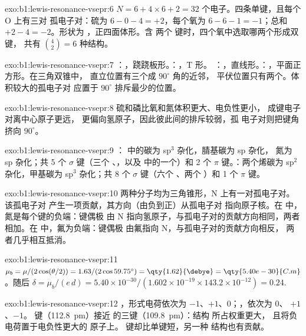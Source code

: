 \begin{solution}{exo:b1:lewis-resonance-vsepr:6}
$N = 6 + 4 \times 6 + 2 = 32$ 个电子。四条单键，且每个 O 上有三对
孤电子对：硫为 $6 - 0 - 4 = +2$，每个氧为
$6 - 6 - 1 = -1$；总和 $+2 - 4 = -2$。形状为 ，正四面体形。含
两个  键时，四个氧中选取哪两个形成双键，
共有 $\binom{4}{2} = 6$ 种结构。
\end{solution}

\begin{solution}{exo:b1:lewis-resonance-vsepr:7}
：，跷跷板形。：，T 形。
：，直线形。：，平面正方形。在三角双锥中，
直立位置有三个成 $90^\circ$ 角的近邻，
平伏位置只有两个。体积较大的孤电子对
应置于 $90^\circ$ 排斥最少的位置。
\end{solution}

\begin{solution}{exo:b1:lewis-resonance-vsepr:8}
硫和磷比氧和氮体积更大、电负性更小，
成键电子对离中心原子更远，
更偏向氢原子，因此彼此间的排斥较弱，孤
电子对则把键角挤向 $90^\circ$。
\end{solution}

\begin{solution}{exo:b1:lewis-resonance-vsepr:9}
： 中的碳为 sp$^3$ 杂化，腈基碳为 sp 杂化，
氮为 sp 杂化；共 5 个 $\sigma$ 键（三个 、，以及
 中的一个）和 2 个 $\pi$ 键。：两个烯碳为
sp$^2$ 杂化，甲基碳为 sp$^3$ 杂化；共 8 个 $\sigma$ 键（六个 、两个
）和 1 个 $\pi$ 键。
\end{solution}

\begin{solution}{exo:b1:lewis-resonance-vsepr:10}
两种分子均为三角锥形，N 上有一对孤电子对。该孤电子对
产生一项贡献，其方向（由负到正）从孤电子对
指向原子核。在  中，氮是每个键的负端：键偶极
由 N 指向氢原子，与孤电子对的贡献方向相同，两者
相加。在  中，氟为负端：键偶极
由氟指向 N，与孤电子对的贡献方向相反，
两者几乎相互抵消。
\end{solution}

\begin{solution}{exo:b1:lewis-resonance-vsepr:11}
$\mu_b = \mu/(2\cos(\theta/2)) = 1.63/(2\cos 59.75^\circ) =
\qty{1.62}{\debye} = \qty{5.40e-30}{C.m}$。随后 $\delta = \mu_b/(e\,d) =
5.40 \times 10^{-30}/(1.602 \times 10^{-19} \times 143.2 \times 10^{-12})
= 0.24$.
\end{solution}

\begin{solution}{exo:b1:lewis-resonance-vsepr:12}
，形式电荷依次为 $-1$、$+1$、$0$；，依次为 $0$、
$+1$、$-1$。 键（\qty{112.8}{pm}）接近
 的三键（\qty{109.8}{pm}）：结构  所占权重更大，
且将负电荷置于电负性更大的
原子上。 键却比单键短，另一种
结构也有贡献。
\end{solution}

